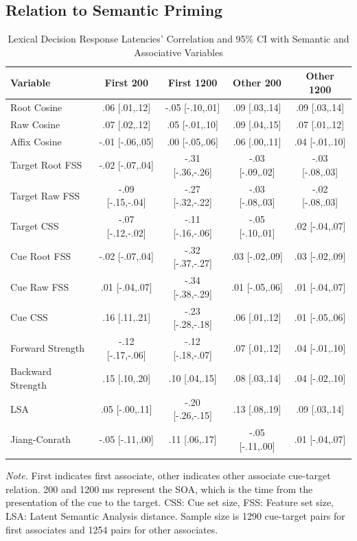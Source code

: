 \documentclass[english,,man]{apa6}
\begin{document}
\hypertarget{relation-to-semantic-priming}{%
\subsection{Relation to Semantic Priming}\label{relation-to-semantic-priming}}

\begin{table}[tbp]
\begin{center}
\begin{threeparttable}
\caption{\label{tab:ldt-table}Lexical Decision Response Latencies' Correlation and 95\% CI with Semantic and Associative Variables}
\small{
\begin{tabular}{lcccc}
\toprule
Variable & \multicolumn{1}{c}{First 200} & \multicolumn{1}{c}{First 1200} & \multicolumn{1}{c}{Other 200} & \multicolumn{1}{c}{Other 1200}\\
\midrule
Root Cosine & .06 [.01,.12] & -.05 [-.10,.01] & .09 [.03,.14] & .09 [.03,.14]\\
Raw Cosine & .07 [.02,.12] & .05 [-.01,.10] & .09 [.04,.15] & .07 [.01,.12]\\
Affix Cosine & -.01 [-.06,.05] & .00 [-.05,.06] & .06 [.00,.11] & .04 [-.01,.10]\\
Target Root FSS & -.02 [-.07,.04] & -.31 [-.36,-.26] & -.03 [-.09,.02] & -.03 [-.08,.03]\\
Target Raw FSS & -.09 [-.15,-.04] & -.27 [-.32,-.22] & -.03 [-.08,.03] & -.02 [-.08,.03]\\
Target CSS & -.07 [-.12,-.02] & -.11 [-.16,-.06] & -.05 [-.10,.01] & .02 [-.04,.07]\\
Cue Root FSS & -.02 [-.07,.04] & -.32 [-.37,-.27] & .03 [-.02,.09] & .03 [-.02,.09]\\
Cue Raw FSS & .01 [-.04,.07] & -.34 [-.38,-.29] & .01 [-.05,.06] & .01 [-.04,.07]\\
Cue CSS & .16 [.11,.21] & -.23 [-.28,-.18] & .06 [.01,.12] & .01 [-.05,.06]\\
Forward Strength & -.12 [-.17,-.06] & -.12 [-.18,-.07] & .07 [.01,.12] & .04 [-.01,.10]\\
Backward Strength & .15 [.10,.20] & .10 [.04,.15] & .08 [.03,.14] & .04 [-.02,.10]\\
LSA & .05 [-.00,.11] & -.20 [-.26,-.15] & .13 [.08,.19] & .09 [.03,.14]\\
Jiang-Conrath & -.05 [-.11,.00] & .11 [.06,.17] & -.05 [-.11,.00] & .01 [-.04,.07]\\
\bottomrule
\addlinespace
\end{tabular}
}
\begin{tablenotes}[para]
\normalsize{\textit{Note.} First indicates first associate, other indicates other associate cue-target relation. 200 and 1200 ms represent the SOA, which is the time from the presentation of the cue to the target. CSS: Cue set size, FSS: Feature set size, LSA: Latent Semantic Analysis distance. Sample size is 1290 cue-target pairs for first associates and 1254 pairs for other associates.}
\end{tablenotes}
\end{threeparttable}
\end{center}
\end{table}
\end{document}

